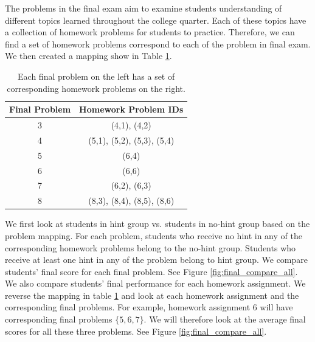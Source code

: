 \documentclass{article} %
\begin{document}
The problems in the final exam aim to examine students understanding of different topics learned throughout the college quarter. Each of these topics have a collection of homework problems for students to practice. Therefore, we can find a set of homework problems correspond to each of the problem in final exam. We then created a mapping show in Table \ref{tab:map}.

\begin{table}[h]
\begin{center}
  \begin{tabular}{ c | c }
   Final Problem & Homework Problem IDs \\ \hline
	3 & (4,1), (4,2) \\
	4 & (5,1), (5,2), (5,3), (5,4) \\
    5 & (6,4) \\
    6 & (6,6) \\
    7 & (6,2), (6,3) \\
    8 & (8,3), (8,4), (8,5), (8,6) \\ \hline
  \end{tabular}
  \caption{Each final problem on the left has a set of corresponding homework problems on the right.}
  \label{tab:map}
  \end{center}
\end{table}

We first look at students in hint group vs. students in no-hint group based on the problem mapping. For each problem, students who receive no hint in any of the corresponding homework problems belong to the no-hint group. Students who receive at least one hint in any of the problem belong to hint group. We compare students' final score for each final problem. See Figure \ref{fig:final_compare_all}. We also compare students' final performance for each homework assignment. We reverse the mapping in table \ref{tab:map} and look at each homework assignment and the corresponding final problems. For example, homework assignment 6 will have corresponding final problems $\{5, 6, 7\}$. We will therefore look at the average final scores for all these three problems. See Figure \ref{fig:final_compare_all}.
\end{document}
